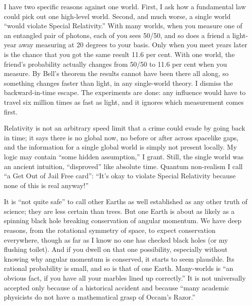 I have two specific reasons against one world. First, I ask how a fundamental law could pick out one high-level world.  Second, and much worse, a single world ``would violate Special Relativity.'' With many worlds, when you measure one of an entangled pair of photons, each of you sees 50/50, and so does a friend a light-year away measuring at 20 degrees to your basis. Only when you meet years later is the chance that you got the same result 11.6 per cent. With one world, the friend's probability actually changes from 50/50 to 11.6 per cent when you measure. By Bell's theorem the results cannot have been there all along, so something changes faster than light, in any single-world theory. I dismiss the backward-in-time escape. The experiments are done: any influence would have to travel six million times as fast as light, and it ignores which measurement comes first. 

Relativity is not an arbitrary speed limit that a crime could evade by going back in time; it says there is no global now, no before or after across spacelike gaps, and the information for a single global world is simply not present locally. My logic may contain ``some hidden assumption,'' I grant. Still, the single world was an ancient intuition, ``disproved'' like absolute time.  Quantum non-realism I call ``a Get Out of Jail Free card'': ``It's okay to violate Special Relativity because none of this is real anyway!'' 

It is ``not quite safe'' to call other Earths as well established as any other truth of science; they are less certain than trees. But one Earth is about as likely as a spinning black hole breaking conservation of angular momentum. We have deep reasons, from the rotational symmetry of space, to expect conservation everywhere, though as far as I know no one has checked black holes (or my flushing toilet). And if you dwell on that one possibility, especially without knowing why angular momentum is conserved, it starts to seem plausible. Its rational probability is small, and so is that of one Earth. Many-worlds is ``an obvious fact, if you have all your marbles lined up correctly.'' It is not universally accepted only because of a historical accident and because ``many academic physicists do not have a mathematical grasp of Occam's Razor.''

